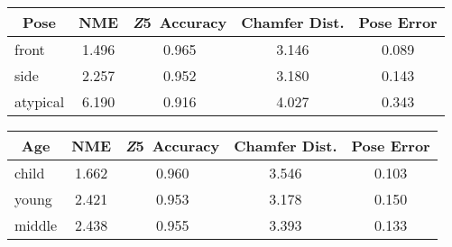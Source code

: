 \documentclass[10pt,twocolumn,letterpaper]{article}
\begin{document}
\begin{table}
\footnotesize
\centering
\label{T:allmetrics}
\begin{tabular}{l|cccc} 
\toprule
\multicolumn{1}{c}{\textbf{ Pose}} & \textbf{\textbf{NME}} & \textbf{\textbf{\textit{Z}5}}~\textbf{\textbf{Accuracy}} & \textbf{\textbf{Chamfer Dist.}} & \multicolumn{1}{l}{\textbf{\textbf{Pose Error}}}  \\ 
\toprule
front                              & 1.496                 & 0.965                                                    & 3.146                              & 0.089                                             \\
side                              & 2.257                 & 0.952                                                    & 3.180                              & 0.143                                             \\
atypical                           & 6.190                 & 0.916                                                    & 4.027                              & 0.343                                             \\
\bottomrule
\end{tabular}
\footnotesize
\label{T:allmetrics}
\begin{tabular}{l|cccc} 
\toprule
\multicolumn{1}{c}{\textbf{Age}} & \textbf{\textbf{NME}} & \textbf{\textbf{\textit{Z}5}}~\textbf{\textbf{Accuracy}} & \textbf{\textbf{Chamfer Dist.}} & \multicolumn{1}{l}{\textbf{\textbf{Pose Error}}}  \\ 
\toprule
child                            & 1.662                 & 0.960                                                    & 3.546                          & 0.103                                             \\
young                            & 2.421                 & 0.953                                                    & 3.178                          & 0.150                                             \\
middle                     & 2.438                 & 0.955                                                    & 3.393                          & 0.133                                             \\


\end{tabular}
\end{table}
\end{document}

